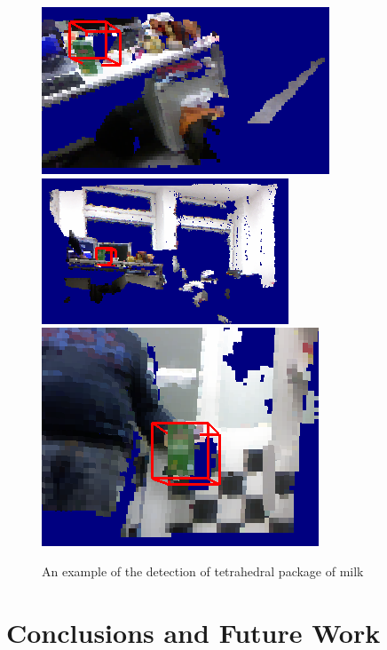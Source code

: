 \documentclass[conference]{sty/IEEEtran}
\begin{document}


\begin{figure}[htb!]
  \begin{center}
    \includegraphics[width=.45\columnwidth]{figures/colorCHLAC/detection7.png}
\hfill
    \includegraphics[width=.45\columnwidth]{figures/colorCHLAC/detection5.png} \\
\hfill
    \includegraphics[width=.9\columnwidth]{figures/colorCHLAC/detection2.png}
\caption{An example of the detection of tetrahedral package of milk}
    \label{fig:milk_testing}
  \end{center}
\end{figure}


\section{Conclusions and Future Work}
\label{sec:conclusion}




\end{document}
